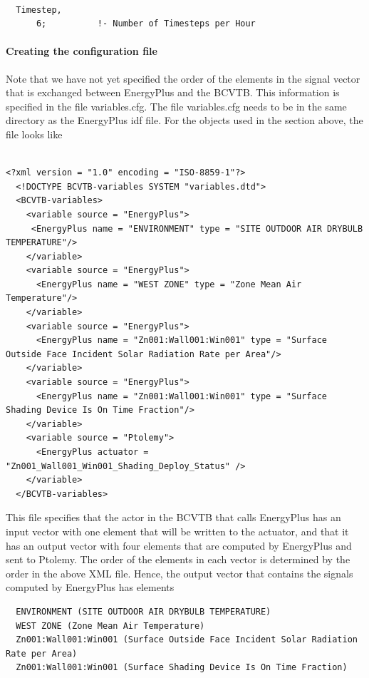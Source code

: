 \begin{lstlisting}

  Timestep,
      6;          !- Number of Timesteps per Hour
\end{lstlisting}

\paragraph{\texorpdfstring{\textbf{Creating the configuration file}}{Creating the configuration file}}\label{creating-the-configuration-file-1}

Note that we have not yet specified the order of the elements in the signal vector that is exchanged between EnergyPlus and the BCVTB. This information is specified in the file variables.cfg. The file variables.cfg needs to be in the same directory as the EnergyPlus idf file. For the objects used in the section above, the file looks like

\begin{lstlisting}

<?xml version = "1.0" encoding = "ISO-8859-1"?>
  <!DOCTYPE BCVTB-variables SYSTEM "variables.dtd">
  <BCVTB-variables>
    <variable source = "EnergyPlus">
     <EnergyPlus name = "ENVIRONMENT" type = "SITE OUTDOOR AIR DRYBULB TEMPERATURE"/>
    </variable>
    <variable source = "EnergyPlus">
      <EnergyPlus name = "WEST ZONE" type = "Zone Mean Air Temperature"/>
    </variable>
    <variable source = "EnergyPlus">
      <EnergyPlus name = "Zn001:Wall001:Win001" type = "Surface Outside Face Incident Solar Radiation Rate per Area"/>
    </variable>
    <variable source = "EnergyPlus">
      <EnergyPlus name = "Zn001:Wall001:Win001" type = "Surface Shading Device Is On Time Fraction"/>
    </variable>
    <variable source = "Ptolemy">
      <EnergyPlus actuator = "Zn001_Wall001_Win001_Shading_Deploy_Status" />
    </variable>
  </BCVTB-variables>
\end{lstlisting}

This file specifies that the actor in the BCVTB that calls EnergyPlus has an input vector with one element that will be written to the actuator, and that it has an output vector with four elements that are computed by EnergyPlus and sent to Ptolemy. The order of the elements in each vector is determined by the order in the above XML file. Hence, the output vector that contains the signals computed by EnergyPlus has elements

\begin{lstlisting}
  ENVIRONMENT (SITE OUTDOOR AIR DRYBULB TEMPERATURE)
  WEST ZONE (Zone Mean Air Temperature)
  Zn001:Wall001:Win001 (Surface Outside Face Incident Solar Radiation Rate per Area)
  Zn001:Wall001:Win001 (Surface Shading Device Is On Time Fraction)
\end{lstlisting}

